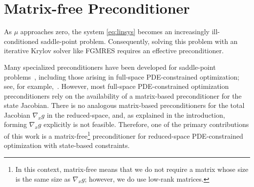 \section{Matrix-free Preconditioner}\label{sec:matfreepc}
As $\mu$ approaches zero, the system \eqref{eq:linsys} becomes an increasingly
ill-conditioned saddle-point problem.  Consequently, solving this problem with
an iterative Krylov solver like FGMRES requires an effective preconditioner.  

Many specialized preconditioners have been developed for saddle-point
problems~\cite{benzi2005numerical}, including those arising in full-space
PDE-constrained optimization; see, for example,~\cite{Rees2010optimal}.
However, most full-space PDE-constrained optimization preconditioners rely on
the availability of a matrix-based preconditioner for the state Jacobian. There
is no analogous matrix-based preconditioners for the total Jacobian $\nabla_x g$
in the reduced-space, and, as explained in the introduction, forming $\nabla_x
g$ explicitly is not feasible.  Therefore, one of the primary contributions of
this work is a matrix-free\footnote{In this context, matrix-free means that we
  do not require a matrix whose size is the same size as $\nabla_x g$; however,
  we do use low-rank matrices.} preconditioner for reduced-space PDE-constrained
optimization with state-based constraints.

